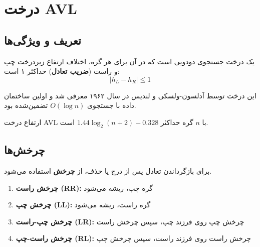 \documentclass{matinbook}
\begin{document}
    \section{درخت AVL}
    
    \subsection{تعریف و ویژگی‌ها}
    
    \begin{definition}
        یک درخت جستجوی دودویی است که در آن
        برای هر گره، اختلاف ارتفاع زیردرخت چپ و راست
        (\textbf{ضریب تعادل}) حداکثر ۱ است:
        \[
        |h_{L} - h_{R}| \leq 1
        \]
        \label{def:avl}
    \end{definition}
    
    این درخت توسط آدلسون-ولسکی و لندیس
    در سال ۱۹۶۲ معرفی شد و اولین ساختمان داده
    با جستجوی $O(\log n)$ تضمین‌شده بود.
    
    \begin{theorem}
        ارتفاع درخت AVL با $n$ گره
        حداکثر $1.44 \log_{2}(n+2) - 0.328$ است.
        \label{thm:avl-height}
    \end{theorem}
    
    \subsection{چرخش‌ها}
    
    برای بازگرداندن تعادل پس از درج یا حذف،
    از \textbf{چرخش} استفاده می‌شود.
    
    \begin{definition}
        \begin{enumerate}
            \item \textbf{چرخش راست (RR):}
            گره چپ، ریشه می‌شود
            \item \textbf{چرخش چپ (LL):}
            گره راست، ریشه می‌شود
            \item \textbf{چرخش چپ-راست (LR):}
            چرخش چپ روی فرزند چپ، سپس چرخش راست
            \item \textbf{چرخش راست-چپ (RL):}
            چرخش راست روی فرزند راست، سپس چرخش چپ
        \end{enumerate}
        \label{def:rotations}
    \end{definition}
    
\end{document}
